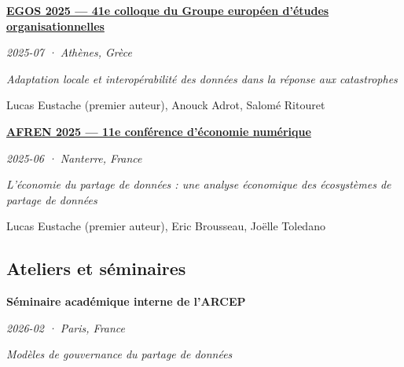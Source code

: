 \documentclass[11pt,a4paper]{article}
\newlength{\cvindent}
\newenvironment{cvblock}[1][1]{%
  \par\noindent\hspace*{#1\cvindent}%
  \begin{minipage}{\dimexpr\linewidth-#1\cvindent\relax}%
}{%
  \end{minipage}\par
}
\newenvironment{cvdetails}{%
  \begin{list}{}{%
    \setlength{\leftmargin}{\cvindent}%
    \setlength{\rightmargin}{0pt}%
    \setlength{\topsep}{0.1em}%
    \setlength{\partopsep}{0pt}%
    \setlength{\parsep}{0.05em}%
    \setlength{\itemsep}{0pt}%
  }\item[]\small\ignorespaces
}{%
  \end{list}
}
\begin{document}
\begin{cvblock}[2]
\textbf{\href{https://www.egos.org/jart/prj3/egos/main.jart?content-id=1721760205556&rel=de&reserve-mode=active&show_prog=yes&subtheme_id=1701434875423}{EGOS 2025 --- 41e colloque du Groupe européen d'études organisationnelles}}\par
\begin{cvdetails}
{\small\itshape 2025-07 · Athènes, Grèce}\par
\textit{Adaptation locale et interopérabilité des données dans la réponse aux catastrophes}\par
{\small Lucas Eustache (premier auteur), Anouck Adrot, Salomé Ritouret}\par
\end{cvdetails}
\end{cvblock}\par\vspace{0.35em}

\begin{cvblock}[2]
\textbf{\href{https://economix.fr/uploads/source/doc/workshops/2025_11_eco_num/program.pdf}{AFREN 2025 --- 11e conférence d'économie numérique}}\par
\begin{cvdetails}
{\small\itshape 2025-06 · Nanterre, France}\par
\textit{L'économie du partage de données : une analyse économique des écosystèmes de partage de données}\par
{\small Lucas Eustache (premier auteur), Eric Brousseau, Joëlle Toledano}\par
\end{cvdetails}
\end{cvblock}\par\vspace{0.35em}

\subsection*{Ateliers et séminaires}
\begin{cvblock}[2]
\textbf{Séminaire académique interne de l'ARCEP}\par
\begin{cvdetails}
{\small\itshape 2026-02 · Paris, France}\par
\textit{Modèles de gouvernance du partage de données}\par
\end{cvdetails}
\end{cvblock}\par\vspace{0.35em}
\end{document}
